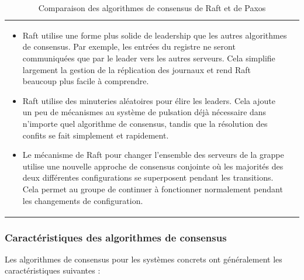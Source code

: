 \begin{table}
\begin{tabular}{p{}p{}}
        \begin{itemize}
            \item Raft utilise une forme plus solide de leadership que les
                autres algorithmes de consensus. Par exemple, les entrées du
                registre ne seront communiquées que par le leader vers les autres
                serveurs. Cela simplifie largement la gestion de la réplication
                des journaux et rend Raft beaucoup plus facile à comprendre.
            \item Raft utilise des minuteries aléatoires pour élire les leaders.
                Cela ajoute un peu de mécanismes au système de pulsation déjà
                nécessaire dans n'importe quel algorithme de consensus, tandis
                que la résolution des confits se fait simplement et rapidement.
            \item Le mécanisme de Raft pour changer l'ensemble des serveurs de
                la grappe utilise une nouvelle approche de consensus conjointe
                où les majorités des deux différentes configurations se
                superposent pendant les transitions. Cela permet au groupe de
                continuer à fonctionner normalement pendant les changements de
                configuration.
        \end{itemize}
    
    \end{tabular}
    \caption{Comparaison des algorithmes de consensus de Raft et de Paxos}
    \label{table:consensus_comparison}
\end{table}

\subsubsection{Caractéristiques des algorithmes de consensus}

Les algorithmes de consensus pour les systèmes concrets ont généralement les
caractéristiques suivantes :

